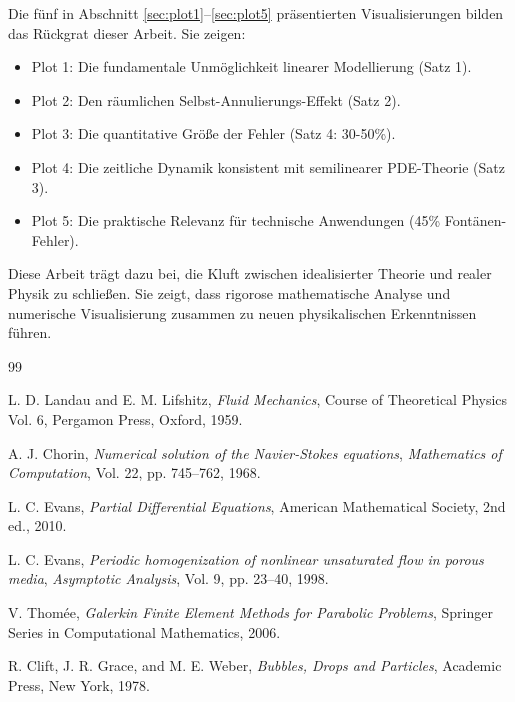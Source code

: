 \documentclass[a4paper,12pt]{article}
\theoremstyle{definition}
\begin{document}
Die fünf in Abschnitt \ref{sec:plot1}--\ref{sec:plot5} präsentierten Visualisierungen bilden das Rückgrat dieser Arbeit. Sie zeigen:

\begin{itemize}
	\item Plot 1: Die fundamentale Unmöglichkeit linearer Modellierung (Satz 1).
	\item Plot 2: Den räumlichen Selbst-Annulierungs-Effekt (Satz 2).
	\item Plot 3: Die quantitative Größe der Fehler (Satz 4: 30-50\%).
	\item Plot 4: Die zeitliche Dynamik konsistent mit semilinearer PDE-Theorie (Satz 3).
	\item Plot 5: Die praktische Relevanz für technische Anwendungen (45\% Fontänen-Fehler).
\end{itemize}

Diese Arbeit trägt dazu bei, die Kluft zwischen idealisierter Theorie und realer Physik zu schließen. Sie zeigt, dass rigorose mathematische Analyse und numerische Visualisierung zusammen zu neuen physikalischen Erkenntnissen führen.

\begin{thebibliography}{99}

L. D. Landau and E. M. Lifshitz,
\emph{Fluid Mechanics},
Course of Theoretical Physics Vol. 6,
Pergamon Press, Oxford, 1959.

A. J. Chorin,
\emph{Numerical solution of the Navier-Stokes equations},
\emph{Mathematics of Computation},
Vol. 22, pp. 745--762, 1968.

L. C. Evans,
\emph{Partial Differential Equations},
American Mathematical Society, 2nd ed., 2010.

L. C. Evans,
\emph{Periodic homogenization of nonlinear unsaturated flow in porous media},
\emph{Asymptotic Analysis},
Vol. 9, pp. 23--40, 1998.

V. Thomée,
\emph{Galerkin Finite Element Methods for Parabolic Problems},
Springer Series in Computational Mathematics, 2006.

R. Clift, J. R. Grace, and M. E. Weber,
\emph{Bubbles, Drops and Particles},
Academic Press, New York, 1978.

\end{thebibliography}
\end{document}
